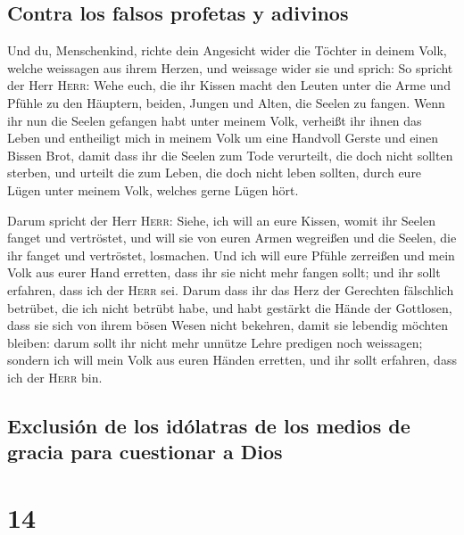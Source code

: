 \hypertarget{contra-los-falsos-profetas-y-adivinos}{%
\subsection{Contra los falsos profetas y
adivinos}\label{contra-los-falsos-profetas-y-adivinos}}

 Und du, Menschenkind, richte dein Angesicht wider die
Töchter in deinem Volk, welche weissagen aus ihrem Herzen, und weissage
wider sie  und sprich: So spricht der Herr \textsc{Herr}:
Wehe euch, die ihr Kissen macht den Leuten unter die Arme und Pfühle zu
den Häuptern, beiden, Jungen und Alten, die Seelen zu fangen. Wenn ihr
nun die Seelen gefangen habt unter meinem Volk, verheißt ihr ihnen das
Leben  und entheiligt mich in meinem Volk um eine
Handvoll Gerste und einen Bissen Brot, damit dass ihr die Seelen zum
Tode verurteilt, die doch nicht sollten sterben, und urteilt die zum
Leben, die doch nicht leben sollten, durch eure Lügen unter meinem Volk,
welches gerne Lügen hört.

 Darum spricht der Herr \textsc{Herr}: Siehe, ich will an
eure Kissen, womit ihr Seelen fanget und vertröstet, und will sie von
euren Armen wegreißen und die Seelen, die ihr fanget und vertröstet,
losmachen.  Und ich will eure Pfühle zerreißen und mein
Volk aus eurer Hand erretten, dass ihr sie nicht mehr fangen sollt; und
ihr sollt erfahren, dass ich der \textsc{Herr} sei. 
Darum dass ihr das Herz der Gerechten fälschlich betrübet, die ich nicht
betrübt habe, und habt gestärkt die Hände der Gottlosen, dass sie sich
von ihrem bösen Wesen nicht bekehren, damit sie lebendig möchten
bleiben:  darum sollt ihr nicht mehr unnütze Lehre
predigen noch weissagen; sondern ich will mein Volk aus euren Händen
erretten, und ihr sollt erfahren, dass ich der \textsc{Herr} bin.

\hypertarget{exclusiuxf3n-de-los-iduxf3latras-de-los-medios-de-gracia-para-cuestionar-a-dios}{%
\subsection{Exclusión de los idólatras de los medios de gracia para
cuestionar a
Dios}\label{exclusiuxf3n-de-los-iduxf3latras-de-los-medios-de-gracia-para-cuestionar-a-dios}}

\hypertarget{section-13}{%
\section{14}\label{section-13}}

